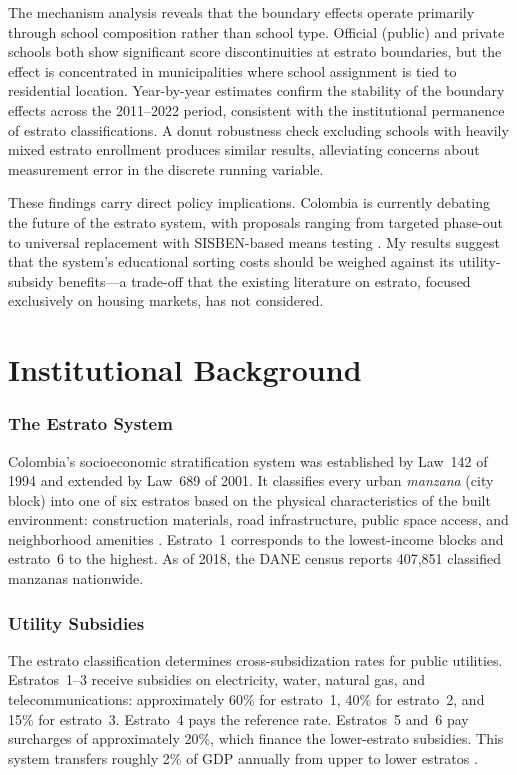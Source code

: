 \documentclass[12pt]{article}
\begin{document}
The mechanism analysis reveals that the boundary effects operate primarily through school composition rather than school type. Official (public) and private schools both show significant score discontinuities at estrato boundaries, but the effect is concentrated in municipalities where school assignment is tied to residential location. Year-by-year estimates confirm the stability of the boundary effects across the 2011--2022 period, consistent with the institutional permanence of estrato classifications. A donut robustness check excluding schools with heavily mixed estrato enrollment produces similar results, alleviating concerns about measurement error in the discrete running variable.

These findings carry direct policy implications. Colombia is currently debating the future of the estrato system, with proposals ranging from targeted phase-out to universal replacement with SISBEN-based means testing \citep{dnp2020estratos}. My results suggest that the system's educational sorting costs should be weighed against its utility-subsidy benefits---a trade-off that the existing literature on estrato, focused exclusively on housing markets, has not considered.

\section{Institutional Background}

\subsubsection*{The Estrato System} Colombia's socioeconomic stratification system was established by Law~142 of 1994 and extended by Law~689 of 2001. It classifies every urban \textit{manzana} (city block) into one of six estratos based on the physical characteristics of the built environment: construction materials, road infrastructure, public space access, and neighborhood amenities \citep{dane2005metodologia}. Estrato~1 corresponds to the lowest-income blocks and estrato~6 to the highest. As of 2018, the DANE census reports 407,851 classified manzanas nationwide.

\subsubsection*{Utility Subsidies} The estrato classification determines cross-subsidization rates for public utilities. Estratos~1--3 receive subsidies on electricity, water, natural gas, and telecommunications: approximately 60\% for estrato~1, 40\% for estrato~2, and 15\% for estrato~3. Estrato~4 pays the reference rate. Estratos~5 and~6 pay surcharges of approximately 20\%, which finance the lower-estrato subsidies. This system transfers roughly 2\% of GDP annually from upper to lower estratos \citep{fedesarrollo2012redistribucion}.
\end{document}
